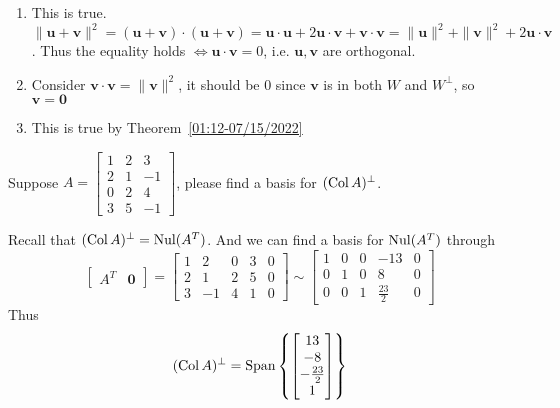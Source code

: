 \documentclass[a4paper,10pt]{article}
\begin{document}
\begin{solution}
\begin{enumerate}[label=\alph*)]
\item This is true. $\|\mathbf u+\mathbf v\|^2=(\mathbf u+\mathbf v)\cdot(\mathbf u+\mathbf v)=\mathbf u\cdot\mathbf u+2\mathbf u\cdot\mathbf v+\mathbf v\cdot\mathbf v=\|\mathbf u\|^2+\|\mathbf v\|^2+2\mathbf u\cdot\mathbf v$. Thus the equality holds $\iff\mathbf u\cdot\mathbf v=0$, i.e. $\mathbf u,\mathbf v$ are orthogonal.
\item Consider $\mathbf v\cdot\mathbf v=\|\mathbf v\|^2$, it should be 0 since $\mathbf v$ is in both $W$ and $W^\perp$, so $\mathbf v=\mathbf 0$
\item This is true by Theorem~\ref{01:12-07/15/2022}
\end{enumerate}
\end{solution}

\begin{problem}
Suppose $A=\begin{bmatrix}
1&2&3\\
2&1&-1\\
0&2&4\\
3&5&-1
\end{bmatrix}$, please find a basis for $(\operatorname{Col} A)^\perp$.
\end{problem}

\begin{solution}
Recall that $(\operatorname{Col} A)^\perp=\operatorname{Nul}(A^T)$. And we can find a basis for $\operatorname{Nul}(A^T)$ through
\[
\left[\begin{array}{c|c}
A^T&\mathbf0
\end{array}\right]=\left[\begin{array}{cccc|c}
1&2&0&3&0\\
2&1&2&5&0\\
3&-1&4&1&0
\end{array}\right]\sim\left[\begin{array}{cccc|c}
1&0&0&-13&0\\
0&1&0&8&0\\
0&0&1&\frac{23}{2}&0
\end{array}\right]
\]
Thus
\[
(\operatorname{Col} A)^\perp=\operatorname{Span}\left\{\begin{bmatrix}
13\\-8\\-\frac{23}{2}\\1
\end{bmatrix}\right\}
\]
\end{solution}
\end{document}
